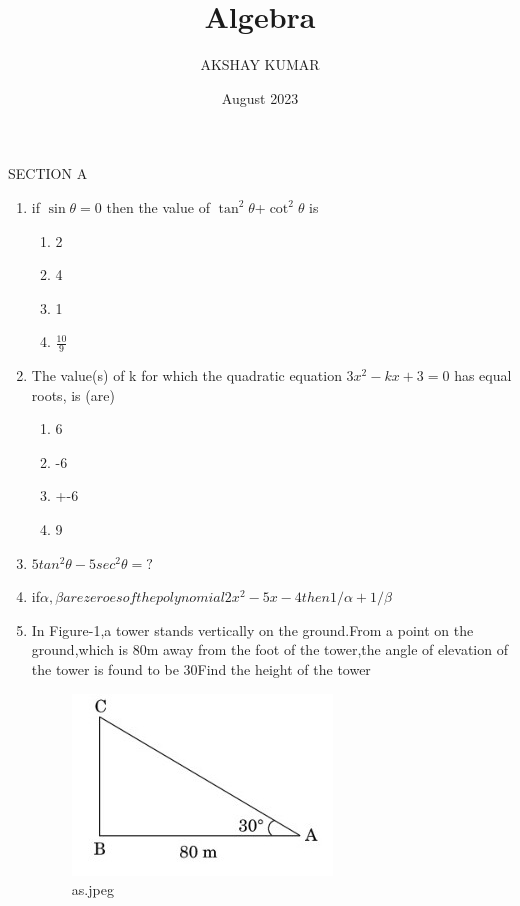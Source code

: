 \documentclass{article}
\title{Algebra }
\author{AKSHAY KUMAR}
\date{August 2023}
\begin{document}
\maketitle

                     {SECTION A}
\begin{enumerate}
    \item if $\sin \theta=0$ then the value of $\tan^2\theta$+$\cot^2\theta$ is
    \begin{enumerate}
        \item 2  \item 4
        \item 1
        \item $\frac{10}{9}$
    \end{enumerate}
    \item The value(s) of k for which the quadratic equation $3x^2-kx+3=0$ has
equal roots, is (are) 
\begin{enumerate}
    \item 6 
    \item -6
    \item +-6
    \item 9
\end{enumerate}
\item $5tan^2 \theta-5sec^2\theta=?$
 \item if$\alpha,\beta are zeroes of the polynomial 2x^2-5x-4 then 1/\alpha+1/\beta$
     \item In Figure-1,a tower stands vertically on the ground.From a point on the ground,which is 80m away from the foot of the tower,the angle of elevation of the tower is found to be 30\degree Find the height of the tower
\begin{figure}[htbp]
    \centering
    \includegraphics[width=\columnwidth]{figs/as.jpeg}
    \caption{as.jpeg}
    \label{fig:example}
\end{figure}


\end{enumerate}
\end{document}
